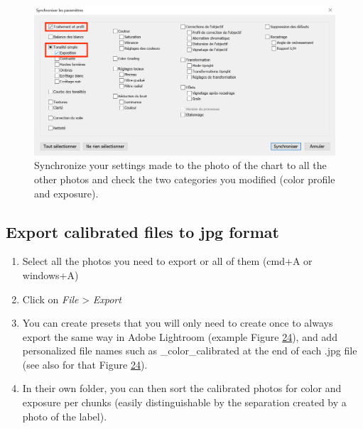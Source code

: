 \documentclass[
]{book}
\begin{document}
\begin{figure}
\hypertarget{fig:synchronize}{%
\centering
\includegraphics{Figures/synchronize_capture.png}
\caption{Synchronize your settings made to the photo of the chart to all the
other photos and check the two categories you modified (color profile
and exposure).}\label{fig:synchronize}
}
\end{figure}

\hypertarget{export-calibrated-files-to-jpg-format}{%
\subsection{Export calibrated files to jpg format}\label{export-calibrated-files-to-jpg-format}}

\begin{enumerate}
\def\labelenumi{\arabic{enumi}.}
\item
  Select all the photos you need to export or all of them (cmd+A or
  windows+A)
\item
  Click on \emph{File} \textgreater{} \emph{Export}
\item
  You can create presets that you will only need to create once to
  always export the same way in Adobe Lightroom (example Figure
  \protect\hyperlink{export_parameters}{24}), and add personalized file names
  such as \_color\_calibrated at the end of each .jpg file (see also
  for that Figure \protect\hyperlink{export_parameters}{24}).
\item
  In their own folder, you can then sort the calibrated photos for
  color and exposure per chunks (easily distinguishable by the
  separation created by a photo of the label).
\end{enumerate}
\end{document}

